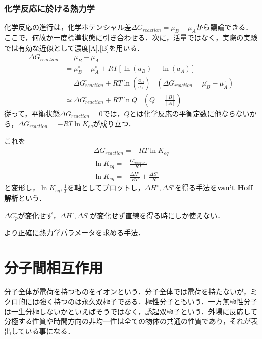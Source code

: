 \documentclass[uplatex, dvipdfmx]{jsreport}
\begin{document}
\subsection{化学反応に於ける熱力学}

化学反応の進行は，化学ポテンシャル差$\Delta G_{reaction}=\mu_B-\mu_A$から議論できる．
ここで，何故か一度標準状態に引き合わせる．次に，活量ではなく，実際の実験では有効な近似として濃度[A],[B]を用いる．
\begin{align*}
    \Delta G_{reaction}&=\mu_B-\mu_A\\
    &= \mu^\circ_B-\mu^\circ_A + RT[\ln(a_B)-\ln(a_A)]\\
    &= \Delta G^\circ_{reaction} + RT\ln\left(\frac{a_B}{a_A}\right)\;\;\;(\Delta G^\circ_{reaction}=\mu^\circ_B-\mu^\circ_A)\\
    &\simeq \Delta G^\circ_{reaction} + RT\ln Q\;\;\;(Q=\frac{[B]}{[A]})
\end{align*}
従って，平衡状態$\Delta G_{reaction}=0$では，$Q$とは化学反応の平衡定数に他ならないから，$\Delta G^\circ_{reaction} =- RT\ln K_{eq}$が成り立つ．

\begin{method}
    これを
\begin{align*}
    \Delta G^\circ_{reaction} =- RT\ln K_{eq}\\
    \ln K_{eq} = -\frac{G^\circ_{reaction}}{RT}\\
    \ln K_{eq} = -\frac{\Delta H^\circ}{RT} + \frac{\Delta S^\circ}{R}
\end{align*}
と変形し，$\ln K_{eq},\frac{1}{T}$を軸としてプロットし，$\Delta H^\circ, \Delta S^\circ$を得る手法を\textbf{van't Hoff解析}という．

$\Delta C^\circ_p$が変化せず，$\Delta H^\circ, \Delta S^\circ$が変化せず直線を得る時にしか使えない．
\end{method}
\begin{method}
    より正確に熱力学パラメータを求める手法．
\end{method}

\chapter{分子間相互作用}
分子全体が電荷を持つものをイオンという．分子全体では電荷を持たないが，ミクロ的には強く持つのは永久双極子である．極性分子ともいう．一方無極性分子は一生分極しないかといえばそうではなく，誘起双極子という．外場に反応して分極する性質や時間方向の非均一性は全ての物体の共通の性質であり，それが表出している事になる．
\end{document}
